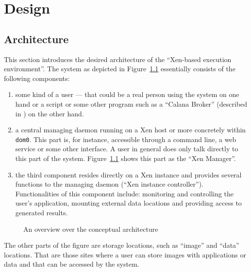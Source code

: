 
\chapter{Design}
\label{cha:design}


\section{Architecture}
\label{sec:architecture}

This  section  introduces  the  desired architecture  of  the  ``Xen-based
execution     environment''.      The     system    as     depicted     in
Figure~\ref{fig:architecture}   essentially   consists   of  the   following
components:
\begin{enumerate}
  
\item some kind of a user --- that could be a real person using the system
  on  one hand  or  a script  or some  other  program such  as a  ``Calana
  Broker''        (described        in        \cite{dalheimer05agentbased,
    dalheimer06calanaprotocol}) on the other hand.
  
\item a central  managing daemon running on a Xen  \cite{xen} host or more
  concretely within \texttt{dom0}.  This part is, for instance, accessible
  through a command line, a web service or some other interface. A user in
  general  does  only   talk  directly  to  this  part   of  the  system.  
  Figure~\ref{fig:architecture} shows this part  as the ``Xen Manager''.
  
\item the third component resides  directly on a Xen instance and provides
  several functions to the  managing daemon (``Xen instance controller''). 
  Functionalities  of this component  include: monitoring  and controlling
  the user's  application, mounting external data  locations and providing
  access to generated results.

\end{enumerate}

\begin{figure}[htbp]
  \begin{center}
  \end{center}
  \caption[Architecture overview]{An overview over the conceptual
    architecture}
  \label{fig:architecture}
\end{figure}

The other parts of the figure are storage locations, such as ``image'' and
``data'' locations.   That are those sites  where a user  can store images
with applications  or data  and that  can be accessed  by the  system.

